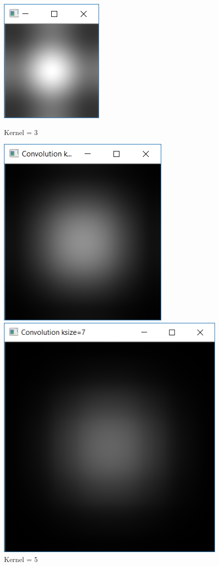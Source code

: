 \documentclass{article}
\begin{document}
\begin{figure}[h]
\begin{minipage}[b]{0.2\linewidth}
\centering
\includegraphics[scale=0.5]{1b22.PNG}
\caption{Kernel = 3}	
\end{minipage}
\begin{minipage}[b]{0.5\linewidth}
\centering
\includegraphics[scale=0.45]{1b33.PNG}
\caption{Kernel = 5}
\end{minipage}
\hspace{0.6cm}
\begin{minipage}[b]{0.1\linewidth}
\centering
\includegraphics[scale=0.45]{1b44.PNG}

\end{minipage}
\end{figure}
\end{document}
